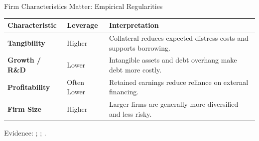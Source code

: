 \begin{frame}{Firm Characteristics Matter: Empirical Regularities}

\begin{table}
\centering
\begin{tabular}{p{3.0cm}p{1.5cm}p{6.5cm}}
\toprule
\textbf{Characteristic} & \textbf{Leverage} & \textbf{Interpretation} \\
\midrule

\textbf{Tangibility}
& Higher
& Collateral reduces expected distress costs and supports borrowing. \\

\addlinespace[0.3em]

\textbf{Growth / R\&D}
& Lower
& Intangible assets and debt overhang make debt more costly. \\

\addlinespace[0.3em]

\textbf{Profitability}
& Often Lower
& Retained earnings reduce reliance on external financing. \\

\addlinespace[0.3em]

\textbf{Firm Size}
& Higher
& Larger firms are generally more diversified and less risky. \\

\bottomrule
\end{tabular}
\end{table}

\vfill

{\scriptsize Evidence: \textcite{titman1988determinants}; 
\textcite{rajan1995what}; \textcite{frank2009capital}.}

\end{frame}

